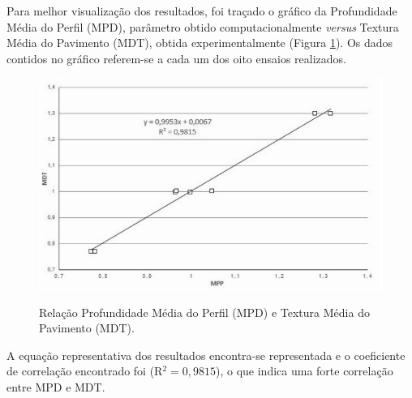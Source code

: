Para melhor visualização dos resultados, foi traçado o gráfico da Profundidade Média do Perfil (MPD), parâmetro obtido computacionalmente \emph{versus} Textura Média do Pavimento (MDT), obtida experimentalmente (Figura \ref{Fig:grafico}). Os dados contidos no gráfico referem-se a cada um dos oito ensaios realizados. 

\begin{figure}[!ht]
\centering
{\includegraphics[scale=0.83]{figures/grafico.jpg}}\\
\caption{Relação Profundidade Média do Perfil (MPD) e Textura Média do Pavimento (MDT).} 
\label{Fig:grafico}
\end{figure}

A equação representativa dos resultados encontra-se representada e o coeficiente de correlação encontrado foi (R$^2=0,9815$), o que indica uma forte correlação entre MPD e MDT. 


